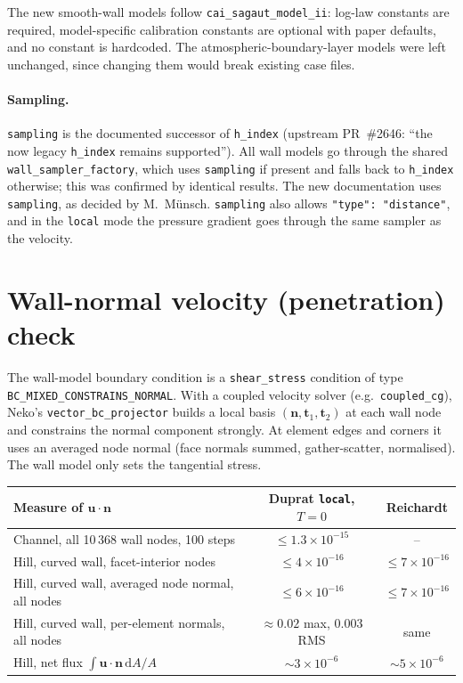 \documentclass[11pt,a4paper]{article}
\newcommand{\code}[1]{\texttt{#1}}
\begin{document}
\noindent The new smooth-wall models follow \code{cai\_sagaut\_model\_ii}:
log-law constants are required, model-specific calibration constants are
optional with paper defaults, and no constant is hardcoded. The
atmospheric-boundary-layer models were left unchanged, since changing them
would break existing case files.

\paragraph{Sampling.} \code{sampling} is the documented successor of
\code{h\_index} (upstream PR~\#2646: ``the now legacy \code{h\_index}
remains supported''). All wall models go through the shared
\code{wall\_sampler\_factory}, which uses \code{sampling} if present and
falls back to \code{h\_index} otherwise; this was confirmed by identical
results. The new documentation uses \code{sampling}, as decided by
M.~Münsch. \code{sampling} also allows \code{"type": "distance"}, and in the
\code{local} mode the pressure gradient goes through the same sampler as
the velocity.

\section{Wall-normal velocity (penetration) check}
\label{sec:penetration}

The wall-model boundary condition is a \code{shear\_stress} condition of
type\\ \code{BC\_MIXED\_CONSTRAINS\_NORMAL}. With a coupled velocity solver
(e.g.\ \code{coupled\_cg}), Neko's \code{vector\_bc\_projector} builds a
local basis $(\mathbf{n}, \mathbf{t}_1, \mathbf{t}_2)$ at each wall node and
constrains the normal component strongly. At element edges and corners it
uses an averaged node normal (face normals summed, gather-scatter,
normalised). The wall model only sets the tangential stress.

\begin{center}
\small
\begin{tabular}{lcc}
\toprule
Measure of $\mathbf{u}\cdot\mathbf{n}$ & Duprat \code{local}, $T=0$ & Reichardt \\
\midrule
Channel, all 10\,368 wall nodes, 100 steps & $\le1.3\times10^{-15}$ & -- \\
Hill, curved wall, facet-interior nodes & $\le4\times10^{-16}$ & $\le7\times10^{-16}$ \\
Hill, curved wall, averaged node normal, all nodes & $\le6\times10^{-16}$ & $\le7\times10^{-16}$ \\
Hill, curved wall, per-element normals, all nodes & $\approx0.02$ max, 0.003 RMS & same \\
Hill, net flux $\int\mathbf{u}\cdot\mathbf{n}\,\mathrm{d}A/A$ & $\sim3\times10^{-6}$ & $\sim5\times10^{-6}$ \\
\bottomrule
\end{tabular}
\end{center}
\end{document}

